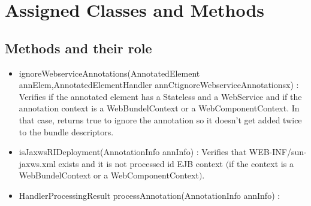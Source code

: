 \section{Assigned Classes and Methods}

	\subsection{Methods and their role}
		\begin{itemize}
			\item ignoreWebserviceAnnotations(AnnotatedElement annElem,AnnotatedElementHandler annCtignoreWebserviceAnnotationsx) : Verifies if the annotated element has a Stateless and a WebService and if the annotation context is a WebBundelContext or a WebComponentContext. In that case, returns true to ignore the annotation so it doesn't get added twice to the bundle descriptors.
			\item isJaxwsRIDeployment(AnnotationInfo annInfo) : Verifies that WEB-INF/sun-jaxws.xml exists and it is not processed id EJB context $($if the context is a WebBundelContext or a WebComponentContext$)$. 
			\item HandlerProcessingResult processAnnotation(AnnotationInfo annInfo) :
		\end{itemize}
